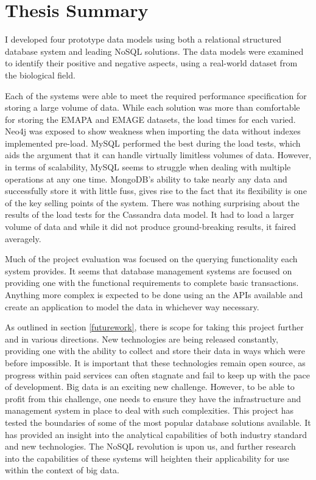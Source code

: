 \section{Thesis Summary}\label{summary}
I developed four prototype data models using both a relational structured database system and leading NoSQL solutions. The data models were examined to identify their positive and negative aspects, using a real-world dataset from the biological field.

Each of the systems were able to meet the required performance specification for storing a large volume of data. While each solution was more than comfortable for storing the EMAPA and EMAGE datasets, the load times for each varied. Neo4j was exposed to show weakness when importing the data without indexes implemented pre-load. MySQL performed the best during the load tests, which aids the argument that it can handle virtually limitless volumes of data. However, in terms of scalability, MySQL seems to struggle when dealing with multiple operations at any one time. MongoDB's ability to take nearly any data and successfully store it with little fuss, gives rise to the fact that its flexibility is one of the key selling points of the system. There was nothing surprising about the results of the load tests for the Cassandra data model. It had to load a larger volume of data and while it did not produce ground-breaking results, it faired averagely.

Much of the project evaluation was focused on the querying functionality each system provides. It seems that database management systems are focused on providing one with the functional requirements to complete basic transactions. Anything more complex is expected to be done using an the APIs available and create an application to model the data in whichever way necessary.

As outlined in section \ref{futurework}, there is scope for taking this project further and in various directions. New technologies are being released constantly, providing one with the ability to collect and store their data in ways which were before impossible. It is important that these technologies remain open source, as progress within paid services can often stagnate and fail to keep up with the pace of development. Big data is an exciting new challenge. However, to be able to profit from this challenge, one needs to ensure they have the infrastructure and management system in place to deal with such complexities. This project has tested the boundaries of some of the most popular database solutions available. It has provided an insight into the analytical capabilities of both industry standard and new technologies. The NoSQL revolution is upon us, and further research into the capabilities of these systems will heighten their applicability for use within the context of big data.
